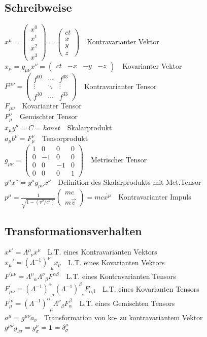 \documentclass[8pt,a4paper]{extarticle}
\newcommand{\frml}[2]{$#1$~\hfill~#2\\}
\newcommand{\LT}[2]{\Lambda^{#1}_{\;\;#2}}
\newcommand{\ILT}[2]{(\Lambda^{-1})^{#1}_{\;\;#2}}
\begin{document}
\begin{multicols}{3}
\subsection{Schreibweise}
\frml{x^\mu = \begin{pmatrix} x^0 \\ x^1 \\ x^2 \\ x^3 \end{pmatrix} = \begin{pmatrix} ct \\ x \\ y \\ z \end{pmatrix}}{Kontravarianter Vektor}
\frml{x_\mu = g_{\mu\nu} x^\nu = \begin{pmatrix} ct & -x & -y & -z \end{pmatrix}}{Kovarianter Vektor}
\frml{F^{\mu\nu} = \begin{pmatrix} f^{00} & \cdots & f^{03} \\ \vdots & \ddots & \vdots \\ f^{30} & \cdots & f^{33} \end{pmatrix}}{Kontravarianter Tensor}
\frml{F_{\mu\nu}}{Kovarianter Tensor}
\frml{F_\mu^\nu}{Gemischter Tensor}
\frml{x_\mu y^\mu = C = konst}{Skalarprodukt}
\frml{a_\mu b^\nu = F^\nu_\mu}{Tensorprodukt}
\frml{g_{\mu \nu} = \begin{pmatrix} 1 & 0 & 0 & 0 \\ 0 & -1 & 0 & 0 \\ 0 & 0 & -1 & 0 \\ 0 & 0 & 0 & 1 \end{pmatrix}}{Metrischer Tensor}
\frml{y^\mu x^\nu = y^\mu g_{\mu\nu} x^\nu}{Definition des Skalarprodukts mit Met.Tensor}
\frml{p^\mu = \frac{1}{\sqrt{1-(v^2/c^2)}}\begin{pmatrix} mc \\ m\vec{v} \end{pmatrix} = mc\dot{x^\mu}}{Kontravarianter Impuls}

\subsection{Transformationsverhalten}
\frml{x^{\mu'} = \LT{\mu}{\nu}x^\nu}{L.T. eines Kontravarianten Vektors}
\frml{x_{\mu}' = \ILT{\nu}{\mu}x_\nu}{L.T. eines Kovarianten Vektors}
\frml{F^{'\mu\nu} = \LT{\mu}{\alpha}\LT{\nu}{\beta}F^{\alpha\beta}}{L.T. eines Kontravarianten Tensors}
\frml{F^{'}_{\mu\nu} = \ILT{\alpha}{\mu}\ILT{\beta}{\nu}F_{\alpha\beta}}{L.T. eines Kovarianten Tensors}
\frml{F^{'\nu}_\mu = \ILT{\alpha}{\mu}\LT{\nu}{\beta} F_\alpha^\beta}{L.T. eines Gemischten Tensors}
\frml{a^\mu = g^{\mu\nu}a_\nu}{Transformation von ko- zu kontravariantem Vektor}
\frml{g^{\mu\nu}g_{\nu\sigma} = g^\mu_\sigma = \mathbf{1} = \delta_\sigma^\mu}{}


\end{multicols}
\end{document}

